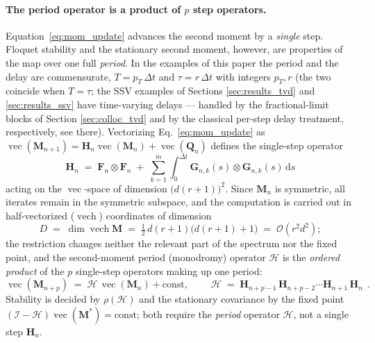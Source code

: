\documentclass[preprint,12pt]{elsarticle}
\begin{document}
\paragraph{The period operator is a product of $p$ step operators.}
Equation~\eqref{eq:mom_update} advances the second moment by a \emph{single} step. Floquet stability and the stationary second moment, however, are properties of the map over one full \emph{period}. In the examples of this paper the period and the delay are commensurate, $T = p_T\,\Delta t$ and $\tau = r\,\Delta t$ with integers $p_T, r$ (the two coincide when $T = \tau$; the SSV examples of Sections \ref{sec:results_tvd} and \ref{sec:results_ssv} have time-varying delays --- handled by the fractional-limit blocks of Section \ref{sec:colloc_tvd} and by the classical per-step delay treatment, respectively, see there). Vectorizing Eq.~\eqref{eq:mom_update} as $\operatorname{vec}(\mathbf{M}_{n+1}) = \mathbf{H}_n \operatorname{vec}(\mathbf{M}_n) + \operatorname{vec}(\mathbf{Q}_n)$ defines the single-step operator
\begin{equation}
\label{eq:Hn_kron}
\mathbf{H}_n \;=\; \mathbf{F}_n \otimes \mathbf{F}_n \;+\; \sum_{k=1}^m \int_0^{\Delta t}\mathbf{G}_{n,k}(s)\otimes\mathbf{G}_{n,k}(s)\,\mathrm{d}s
\end{equation}
acting on the $\operatorname{vec}$-space of dimension $\big(d(r{+}1)\big)^2$. Since $\mathbf{M}_n$ is symmetric, all iterates remain in the symmetric subspace, and the computation is carried out in half-vectorized ($\operatorname{vech}$) coordinates of dimension
\begin{equation}
D \;=\; \dim\operatorname{vech}\mathbf{M} \;=\; \tfrac{1}{2}\,d(r{+}1)\big(d(r{+}1)+1\big) \;=\; \mathcal{O}(r^2 d^2);
\end{equation}
the restriction changes neither the relevant part of the spectrum nor the fixed point,
and the second-moment period (monodromy) operator $\mathcal{H}$ is the \emph{ordered product} of the $p$ single-step operators making up one period:
\begin{equation}
\label{eq:period_product}
\operatorname{vec}(\mathbf{M}_{n+p}) \;=\; \mathcal{H}\,\operatorname{vec}(\mathbf{M}_n) + \text{const},
\qquad
\boxed{\;\mathcal{H} \;=\; \mathbf{H}_{n+p-1}\,\mathbf{H}_{n+p-2}\cdots\mathbf{H}_{n+1}\,\mathbf{H}_{n}\;}\,.
\end{equation}
Stability is decided by $\rho(\mathcal{H})$ and the stationary covariance by the fixed point $(\mathcal{I}-\mathcal{H})\operatorname{vec}(\mathbf{M}^*)=\text{const}$; both require the \emph{period} operator $\mathcal{H}$, not a single step $\mathbf{H}_n$.
\end{document}
